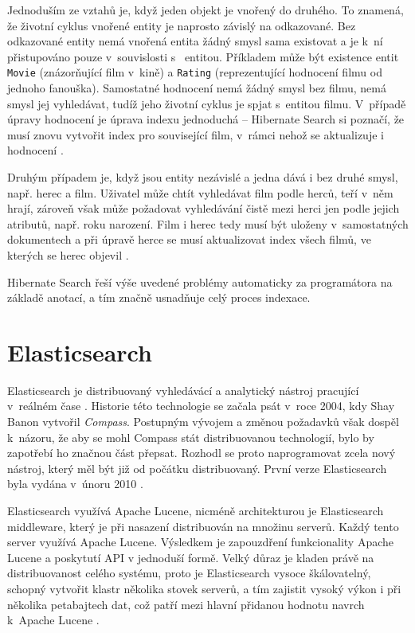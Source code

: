 \documentclass[11pt,oneside]{fithesis2}
\begin{document}
Jednoduším ze vztahů je, když jeden objekt je vnořený do druhého. To znamená, že životní cyklus vnořené entity je naprosto závislý na odkazované. Bez odkazované entity nemá vnořená entita žádný smysl sama existovat a je k~ní přistupováno pouze v~souvislosti s~ entitou. Příkladem může být existence entit \texttt{Movie} (znázorňující film v~kině) a \texttt{Rating} (reprezentující hodnocení filmu od jednoho fanouška). Samostatné hodnocení nemá žádný smysl bez filmu, nemá smysl jej vyhledávat, tudíž jeho životní cyklus je spjat s~entitou filmu. V~případě úpravy hodnocení je úprava indexu jednoduchá -- Hibernate Search si poznačí, že musí znovu vytvořit index pro související film, v~rámci nehož se aktualizuje i hodnocení \cite[str. 108]{HibernateSearchAction}.

Druhým případem je, když jsou entity nezávislé a jedna dává i bez druhé smysl, např. herec a film. Uživatel může chtít vyhledávat film podle herců, teří v~něm hrají, zároveň však může požadovat vyhledávání čistě mezi herci jen podle jejich atributů, např. roku narození. Film i herec tedy musí být uloženy v~samostatných dokumentech a při úpravě herce se musí aktualizovat index všech filmů, ve kterých se herec objevil \cite[str. 110]{HibernateSearchAction}. 

Hibernate Search řeší výše uvedené problémy automaticky za programátora na základě anotací, a tím značně usnadňuje celý proces indexace.

\section{Elasticsearch}
\label{ElasticsearchChapter}
Elasticsearch je distribuovaný vyhledávácí a analytický nástroj pracující v~reálném čase \cite{ElasticsearchDefinitiveGuide}. Historie této technologie se začala psát v~roce 2004, kdy Shay Banon vytvořil \emph{Compass}. Postupným vývojem a změnou požadavků však dospěl k~názoru, že aby se mohl Compass stát distribuovanou technologií, bylo by zapotřebí ho značnou část přepsat. Rozhodl se proto naprogramovat zcela nový nástroj, který měl být již od počátku distribuovaný. První verze Elasticsearch byla vydána v~únoru 2010 \cite{ElasticsearchWiki}.

Elasticsearch využívá Apache Lucene, nicméně architekturou je Elasticsearch middleware, který je při nasazení distribuován na množinu serverů. Každý tento server využívá Apache Lucene. Výsledkem je zapouzdření funkcionality Apache Lucene a poskytutí API v jednoduší formě. Velký důraz je kladen právě na distribuovanost celého systému, proto je Elasticsearch vysoce škálovatelný, schopný vytvořit klastr několika stovek serverů, a tím zajistit vysoký výkon i při několika petabajtech dat, což patří mezi hlavní přidanou hodnotu navrch k~Apache Lucene \cite{ElasticsearchDefinitiveGuide}.
\end{document}

